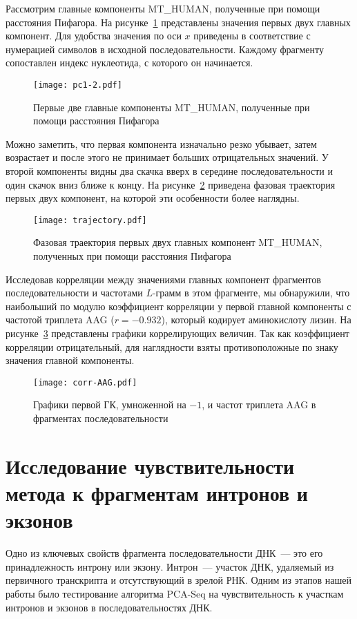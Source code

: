 Рассмотрим главные компоненты MT\_HUMAN, полученные при помощи расстояния Пифагора. На рисунке~\ref{pc1-2} представлены значения первых двух главных компонент. Для удобства значения по оси $x$ приведены в соответствие с нумерацией символов в исходной последовательности. Каждому фрагменту сопоставлен индекс нуклеотида, с которого он начинается.

\begin{figure}[h]
  \centering
  \texttt{[image: pc1-2.pdf]}
  \caption{Первые две главные компоненты MT\_HUMAN, полученные при помощи расстояния Пифагора}
  \label{pc1-2}
\end{figure}

Можно заметить, что первая компонента изначально резко убывает, затем возрастает и после этого не принимает больших отрицательных значений. У второй компоненты видны два скачка вверх в середине последовательности и один скачок вниз ближе к концу. На рисунке~\ref{trajectory} приведена фазовая траектория первых двух компонент, на которой эти особенности более наглядны.

\begin{figure}[h]
  \centering
  \texttt{[image: trajectory.pdf]}
  \caption{Фазовая траектория первых двух главных компонент MT\_HUMAN, полученных при помощи расстояния Пифагора}
  \label{trajectory}
\end{figure}

Исследовав корреляции между значениями главных компонент фрагментов последовательности и частотами $L$-грамм в этом фрагменте, мы обнаружили, что наибольший по модулю коэффициент корреляции у первой главной компоненты с частотой триплета AAG ($r = -0.932$), который кодирует аминокислоту лизин. На рисунке~\ref{corr-AAG} представлены графики коррелирующих величин. Так как коэффициент корреляции отрицательный, для наглядности взяты противоположные по знаку значения главной компоненты.

\begin{figure}[h]
  \centering
  \texttt{[image: corr-AAG.pdf]}
  \caption{Графики первой ГК, умноженной на $-1$, и частот триплета AAG в фрагментах последовательности}
  \label{corr-AAG}
\end{figure}

\section{Исследование чувствительности метода к фрагментам интронов и экзонов}

Одно из ключевых свойств фрагмента последовательности ДНК~--- это его принадлежность интрону или экзону. Интрон~--- участок ДНК, удаляемый из первичного транскрипта и отсутствующий в зрелой РНК. Одним из этапов нашей работы было тестирование алгоритма PCA-Seq на чувствительность к участкам интронов и экзонов в последовательностях ДНК.

